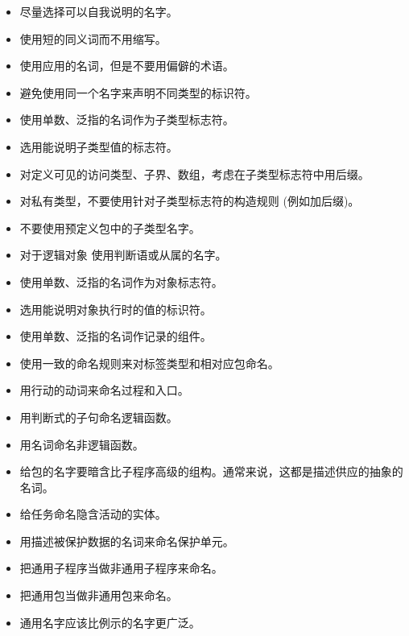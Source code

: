 \noindent
\begin{itemize}
    \item 尽量选择可以自我说明的名字。
    \item 使用短的同义词而不用缩写。
    \item 使用应用的名词，但是不要用偏僻的术语。
    \item 避免使用同一个名字来声明不同类型的标识符。
    \item 使用单数、泛指的名词作为子类型标志符。
    \item 选用能说明子类型值的标志符。
    \item 对定义可见的访问类型、子界、数组，考虑在子类型标志符中用后缀。
    \item 对私有类型，不要使用针对子类型标志符的构造规则 (例如加后缀)。
    \item 不要使用预定义包中的子类型名字。
    \item 对于逻辑对象 使用判断语或从属的名字。
    \item 使用单数、泛指的名词作为对象标志符。
    \item 选用能说明对象执行时的值的标识符。
    \item 使用单数、泛指的名词作记录的组件。
    \item 使用一致的命名规则来对标签类型和相对应包命名。

    \item 用行动的动词来命名过程和入口。
    \item 用判断式的子句命名逻辑函数。
    \item 用名词命名非逻辑函数。
    \item 给包的名字要暗含比子程序高级的组构。通常来说，这都是描述供应的抽象的
名词。
    \item 给任务命名隐含活动的实体。
    \item 用描述被保护数据的名词来命名保护单元。
    \item 把通用子程序当做非通用子程序来命名。
    \item 把通用包当做非通用包来命名。
    \item 通用名字应该比例示的名字更广泛。


\end{itemize}
